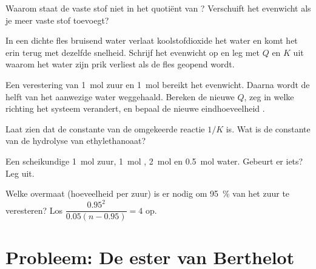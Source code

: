 \begin{exercise}[$\star\star$]\label{exo:g12:equilibrium:10}
Waarom staat de vaste stof niet in het quotiënt van
? Verschuift het evenwicht als je meer vaste
stof toevoegt?
\end{exercise}

\begin{exercise}[$\star\star$]\label{exo:g12:equilibrium:11}
In een dichte fles bruisend water verlaat koolstofdioxide het water en
komt het erin terug met dezelfde snelheid. Schrijf het evenwicht
 op en leg met $Q$ en $K$ uit waarom het water zijn
prik verliest als de fles geopend wordt.
\end{exercise}

\begin{exercise}[$\star\star\star$]\label{exo:g12:equilibrium:12}
Een verestering van \qty{1}{mol} zuur en \qty{1}{mol}  bereikt het
evenwicht. Daarna wordt de helft van het aanwezige water weggehaald.
Bereken de nieuwe $Q$, zeg in welke richting het systeem verandert, en
bepaal de nieuwe eindhoeveelheid .
\end{exercise}

\begin{exercise}[$\star\star\star$]\label{exo:g12:equilibrium:13}
Laat zien dat de constante van de omgekeerde reactie $1/K$ is. Wat is de
constante van de hydrolyse van ethylethanoaat?
\end{exercise}

\begin{exercise}[$\star\star\star$]\label{exo:g12:equilibrium:14}
Een scheikundige  \qty{1}{mol} zuur, \qty{1}{mol} ,
\qty{2}{mol}  en \qty{0.5}{mol} water. Gebeurt er iets? Leg uit.
\end{exercise}

\begin{exercise}[$\star\star\star$]\label{exo:g12:equilibrium:15}
Welke overmaat  (hoeveelheid per  zuur) is er nodig om
\qty{95}{\percent} van het zuur te veresteren? Los
$\dfrac{0.95^2}{0.05(n - 0.95)} =
4$ op.
\end{exercise}

\section{Probleem: De ester van Berthelot}

